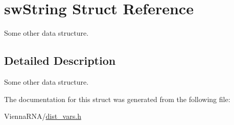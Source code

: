 \hypertarget{structswString}{}\section{sw\+String Struct Reference}
\label{structswString}


Some other data structure.  




\subsection{Detailed Description}
Some other data structure. 

The documentation for this struct was generated from the following file\+:\begin{DoxyCompactItemize}
\item 
Vienna\+R\+N\+A/\hyperlink{dist__vars_8h}{dist\+\_\+vars.\+h}\end{DoxyCompactItemize}
